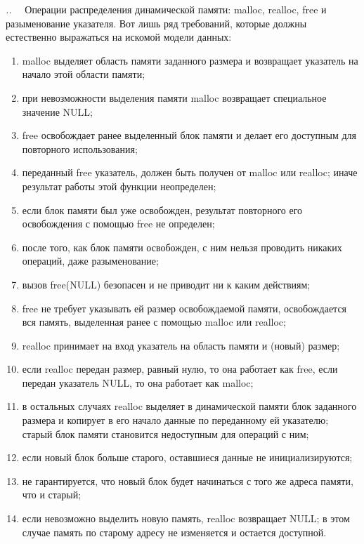 \documentclass[14pt, twoside]{extreport}
\newcounter{problem_type}[chapter]
\newcounter{zadacha}[problem_type]
\newcommand{\z}{\vspace{0.5cm}\par\addtocounter{zadacha}{1}%
\textit{\arabic{chapter}.\arabic{problem_type}.\arabic{zadacha}}~~  }
\begin{document}
\z Операции распределения динамической памяти: malloc, realloc, free и разыменование указателя. Вот лишь ряд требований, которые должны естественно выражаться на искомой модели данных:
\begin{enumerate}
  \item malloc выделяет область памяти заданного размера и возвращает указатель на начало этой области памяти;
  \item при невозможности выделения памяти malloc возвращает специальное значение NULL;
  \item free освобождает ранее выделенный блок памяти и делает его доступным для повторного использования;
  \item переданный free указатель, должен быть получен от malloc или realloc; иначе результат работы этой функции неопределен;
  \item если блок памяти был уже освобожден, результат повторного его освобождения с помощью free не определен;
  \item после того, как блок памяти освобожден, с ним нельзя проводить никаких операций, даже разыменование;
  \item вызов free(NULL) безопасен и не приводит ни к каким действиям;
  \item free не требует указывать ей размер освобождаемой памяти, освобождается вся память, выделенная ранее с помощью malloc или realloc;
  \item realloc принимает на вход указатель на область памяти и (новый) размер;
  \item если realloc передан размер, равный нулю, то она работает как free, если передан указатель NULL, то она работает как malloc;
  \item в остальных случаях realloc выделяет в динамической памяти блок заданного размера и копирует в его начало данные по переданному ей указателю; старый блок памяти становится недоступным для операций с ним;
  \item если новый блок больше старого, оставшиеся данные не инициализируются;
  \item не гарантируется, что новый блок будет начинаться с того же адреса памяти, что и старый;
  \item если невозможно выделить новую память, realloc возвращает NULL; в этом случае память по старому адресу не изменяется и остается доступной.
\end{enumerate}

\end{document}
